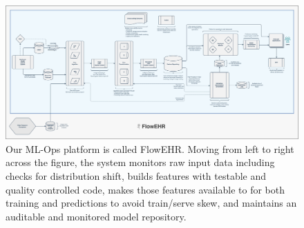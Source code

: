 \documentclass[utf8]{FrontiersinVancouver}
\begin{document}
\begin{figure}[h!]
\begin{center}
\includegraphics[width=15cm]{assets/flowehr.png}
\end{center}
\caption{
Our ML-Ops platform is called FlowEHR. Moving from left to right across the figure, the system monitors raw input data including checks for distribution shift, builds features with testable and quality controlled code, makes those features available to for both training and predictions to avoid train/serve skew, and maintains an auditable and monitored model repository.}\label{fig:2}
\end{figure}

\end{document}
